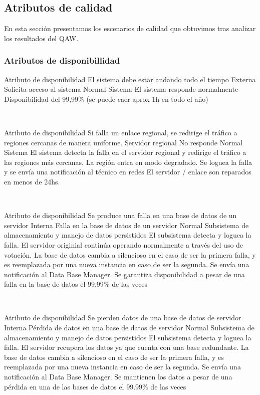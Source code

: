 \subsection{Atributos de calidad}

En esta sección presentamos los escenarios de calidad que obtuvimos tras analizar los resultados del QAW.

\subsubsection{Atributos de disponibillidad}

\escenario
{Atributo de disponibilidad}
{El sistema debe estar andando todo el tiempo}
{Externa}
{Solicita acceso al sistema}
{Normal}
{Sistema}
{El sistema responde normalmente}
{Disponibilidad del 99,99\% (se puede caer aprox 1h en todo el año)}


~

\escenario
{Atributo de disponibilidad}
{Si falla un enlace regional, se redirige el tráfico a regiones cercanas de manera uniforme.}
{Servidor regional}
{No responde}
{Normal}
{Sistema}
{El sistema detecta la falla en el servidor regional y redirige el tráfico a las regiones más cercanas. La región entra en modo degradado. Se loguea la falla y se envía una notificación al técnico en redes}
{El servidor / enlace son reparados en menos de 24hs.}


~

\escenario
{Atributo de disponibilidad}
{Se produce una falla en una base de datos de un servidor}
{Interna}
{Falla en la base de datos de un servidor}
{Normal}
{Subsistema de almacenamiento y manejo de datos persistidos}
{El subsistema detecta y loguea la falla. El servidor originial continúa operando normalmente a través del uso de votación. La base de datos cambia a silencioso en el caso de ser la primera falla, y es reemplazada por una nueva instancia en caso de ser la segunda. Se envía una notificación al Data Base Manager.}
{Se garantiza disponibilidad a pesar de una falla en la base de datos el 99.99\% de las veces}

~

\escenario
{Atributo de disponibilidad}
{Se pierden datos de una base de datos de servidor}
{Interna}
{Pérdida de datos en una base de datos de servidor }
{Normal}
{Subsistema de almacenamiento y manejo de datos persistidos}
{El subsistema detecta y loguea la falla. El servidor recupera los datos ya que cuenta con una base redundante. La base de datos cambia a silencioso en el caso de ser la primera falla, y es reemplazada por una nueva instancia en caso de ser la segunda. Se envía una notificación al Data Base Manager.}
{Se mantienen los datos a pesar de una pérdida en una de las bases de datos el 99.99\% de las veces}

